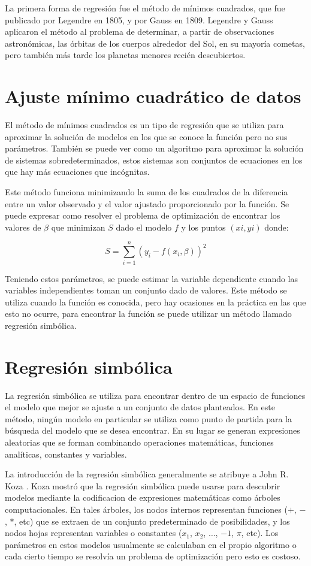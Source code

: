 La primera forma de regresión fue el método de mínimos cuadrados, que fue publicado por Legendre en 1805, y por Gauss en 1809. Legendre y Gauss aplicaron el método al problema de determinar, a partir de observaciones astronómicas, las órbitas de los cuerpos alrededor del Sol, en su mayoría cometas, pero también más tarde los planetas menores recién descubiertos.

\section{Ajuste mínimo cuadrático de datos}

El método de mínimos cuadrados es un tipo de regresión que se utiliza para aproximar la solución de modelos en los que se conoce la función pero no sus parámetros. También se puede ver como un algoritmo para aproximar la solución de sistemas sobredeterminados, estos sistemas son conjuntos de ecuaciones en los que hay más ecuaciones que incógnitas.

Este método funciona minimizando la suma de los cuadrados de la diferencia entre un valor observado y el valor ajustado proporcionado por la función. Se puede expresar como resolver el problema de optimización de encontrar los valores de $\beta$ que minimizan $S$ dado el modelo $f$ y los puntos $(xi, yi)$ donde:

$$S = \sum_{i=1}^{n}(y_i - f(x_i, \beta))^2$$

Teniendo estos parámetros, se puede estimar la variable dependiente cuando las variables independientes toman un conjunto dado de valores. Este método se utiliza cuando la función es conocida, pero hay ocasiones en la práctica en las que esto no ocurre, para encontrar la función se puede utilizar un método llamado regresión simbólica.

\section{Regresión simbólica}

La regresión simbólica se utiliza para encontrar dentro de un espacio de funciones el modelo que mejor se ajuste a un conjunto de datos planteados. En este método, ningún modelo en particular se utiliza como punto de partida para la búsqueda del modelo que se desea encontrar. En su lugar se generan expresiones aleatorias que se forman combinando operaciones matemáticas, funciones analíticas, constantes y variables.

La introducción de la regresión simbólica generalmente se atribuye a John R. Koza \cite{zelinka2005analytic}. Koza mostró que la regresión simbólica puede usarse para descubrir modelos mediante la codificacion de expresiones matemáticas como árboles computacionales. En tales árboles, los nodos internos representan funciones ($+$, $-$, $*$, etc) que se extraen de un conjunto predeterminado de posibilidades, y los nodos hojas representan variables o constantes ($x_1$, $x_2$, $\dots$, $-1$, $\pi$, etc). Los parámetros en estos modelos usualmente se calculaban en el propio algoritmo o cada cierto tiempo se resolvía un problema de optimización pero esto es costoso.

